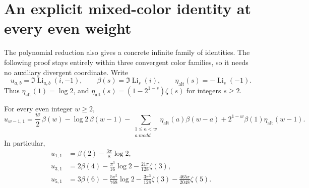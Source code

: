 \section{An explicit mixed-color identity at every even weight}
\label{newmixed:sec:identity}

The polynomial reduction also gives a concrete infinite family of
identities.  The following proof stays entirely within three convergent
color families, so it needs no auxiliary divergent coordinate.
Write
\[
 u_{a,b}=\Im\operatorname{Li}_{a,b}(i,-1),\qquad
 \beta(s)=\Im\operatorname{Li}_s(i),\qquad
 \eta_{\mathrm{alt}}(s)=-\operatorname{Li}_s(-1).
\]
Thus $\eta_{\mathrm{alt}}(1)=\log2$, and
$\eta_{\mathrm{alt}}(s)=(1-2^{1-s})\zeta(s)$ for integers $s\ge2$.

\begin{theorem}
\label{newmixed:thm:family}
For every even integer $w\ge2$,
\begin{equation}\label{newmixed:eq:family}
 \boxed{\displaystyle
 u_{w-1,1}
 =\frac w2\,\beta(w)-\log2\,\beta(w-1)
  -\sum_{\substack{1\le a<w\\a\ {
m odd}}}
       \eta_{\mathrm{alt}}(a)\beta(w-a)
  +2^{1-w}\beta(1)\eta_{\mathrm{alt}}(w-1).}
\end{equation}
In particular,
\begin{align}
 u_{1,1}&=\beta(2)-\frac{3\pi}{8}\log2,\label{newmixed:eq:w2}\\
 u_{3,1}&=2\beta(4)-\frac{\pi^3}{16}\log2
                    -\frac{21\pi}{128}\zeta(3),\label{newmixed:eq:w4}\\
 u_{5,1}&=3\beta(6)-\frac{5\pi^5}{768}\log2
                    -\frac{3\pi^3}{128}\zeta(3)
                    -\frac{465\pi}{2048}\zeta(5).
 \label{newmixed:eq:w6}
\end{align}
\end{theorem}
